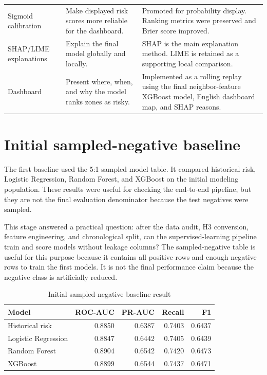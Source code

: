 \begin{table}[H]
\begin{tabularx}{\textwidth}{L{0.28\textwidth}L{0.30\textwidth}Y}
Sigmoid calibration & Make displayed risk scores more reliable for the dashboard. & Promoted for probability display. Ranking metrics were preserved and Brier score improved. \\
SHAP/LIME explanations & Explain the final model globally and locally. & SHAP is the main explanation method. LIME is retained as a supporting local comparison. \\
Dashboard & Present where, when, and why the model ranks zones as risky. & Implemented as a rolling replay using the final neighbor-feature XGBoost model, English dashboard map, and SHAP reasons. \\
\bottomrule
\end{tabularx}
\end{table}

\section{Initial sampled-negative baseline}

The first baseline used the 5:1 sampled model table. It compared historical risk, Logistic Regression, Random Forest, and XGBoost on the initial modeling population. These results were useful for checking the end-to-end pipeline, but they are not the final evaluation denominator because the test negatives were sampled.

This stage answered a practical question: after the data audit, H3 conversion, feature engineering, and chronological split, can the supervised-learning pipeline train and score models without leakage columns? The sampled-negative table is useful for this purpose because it contains all positive rows and enough negative rows to train the first models. It is not the final performance claim because the negative class is artificially reduced.

\begin{table}[H]
\centering
\caption{Initial sampled-negative baseline result}
\label{tab:initial_sampled_negative_baseline}
\small
\begin{tabular}{lrrrr}
\toprule
\textbf{Model} & \textbf{ROC-AUC} & \textbf{PR-AUC} & \textbf{Recall} & \textbf{F1} \\
\midrule
Historical risk & 0.8850 & 0.6387 & 0.7403 & 0.6437 \\
Logistic Regression & 0.8847 & 0.6442 & 0.7405 & 0.6439 \\
Random Forest & 0.8904 & 0.6542 & 0.7420 & 0.6473 \\
XGBoost & 0.8899 & 0.6544 & 0.7437 & 0.6471 \\
\bottomrule
\end{tabular}
\end{table}

